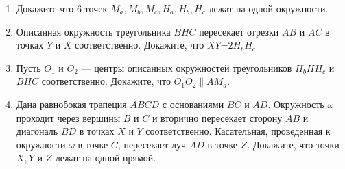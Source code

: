 \documentclass{article}
\begin{document}
\begin{enumerate}[label*=\protect\fbox{\arabic{enumi}}]
\item Докажите что 6 точек  $M_a, M_b, M_c, H_a, H_b, H_c$ лежат на одной окружности.

\item Описанная окружность треугольника $BHC$ пересекает отрезки $AB$ и $AC$ в точках $Y$ и $X$ соответственно. Докажите, что $XY$=$2H_bH_c$

\item Пусть $O_1$ и $O_2$ — центры описанных окружностей треугольников $H_bHH_c$ и $BHC$ соответственно. Докажите, что $O_1O_2 \parallel AM_a$.

\item Дана равнобокая трапеция $ABCD$ с основаниями $BC$ и $AD$.
Окружность $\omega$ проходит через вершины $B$ и $C$ и вторично пересекает сторону $AB$ и диагональ $BD$ в точках $X$ и $Y$ соответственно. Касательная, проведенная к окружности $\omega$ в точке $C$,
пересекает луч $AD$ в точке $Z$. Докажите, что точки $X, Y$ и $Z$
лежат на одной прямой. 


\end{enumerate}
\end{document}
